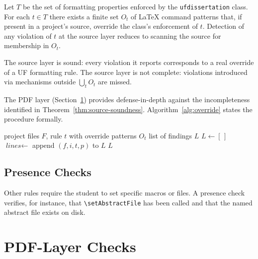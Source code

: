 \begin{lemma}\label{lem:override}
Let $T$ be the set of formatting properties enforced by the
\texttt{ufdissertation} class. For each $t \in T$ there exists a finite
set $O_t$ of LaTeX command patterns that, if present in a project's
source, override the class's enforcement of $t$. Detection of any
violation of $t$ at the source layer reduces to scanning the source
for membership in $O_t$.
\end{lemma}

\begin{theorem}\label{thm:source-soundness}
The source layer is sound: every violation it reports corresponds to a
real override of a UF formatting rule. The source layer is not
complete: violations introduced via mechanisms outside $\bigcup_t O_t$
are missed.
\end{theorem}

\noindent The PDF layer (Section~\ref{sec:pdf}) provides
defense-in-depth against the incompleteness identified in
Theorem~\ref{thm:source-soundness}. Algorithm~\ref{alg:override} states
the procedure formally.

\begin{algorithm}[H]
\caption{Source-layer override scan for a single rule.}
\label{alg:override}
\begin{algorithmic}[1]
    \Require project files $F$, rule $t$ with override patterns $O_t$
    \Ensure list of findings $L$
    \State $L \gets [\,]$
        \State $\textit{lines} \gets$ 
                    \State append $(f, i, t, p)$ to $L$
                \EndIf
            \EndFor
        \EndFor
    \EndFor
    \State \Return $L$
\end{algorithmic}
\end{algorithm}

\subsection{Presence Checks}

Other rules require the student to set specific macros or files. A
presence check verifies, for instance, that
\texttt{\textbackslash setAbstractFile} has been called and that the
named abstract file exists on disk.

\section{PDF-Layer Checks}\label{sec:pdf}

